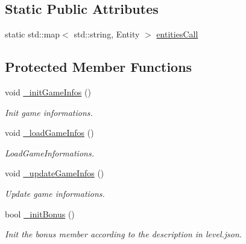 \subsection*{Static Public Attributes}
\begin{DoxyCompactItemize}
\item 
static std\+::map$<$ std\+::string, Entity $>$ \hyperlink{class_scene_game_a9e56bd4fd7c24e7097e29b7e4aff1986}{entities\+Call}
\end{DoxyCompactItemize}
\subsection*{Protected Member Functions}
\begin{DoxyCompactItemize}
\item 
\mbox{\label{class_scene_game_a8e065f6ed85191a671aaf9df7f13e08c}} 
void \hyperlink{class_scene_game_a8e065f6ed85191a671aaf9df7f13e08c}{\+\_\+init\+Game\+Infos} ()
\begin{DoxyCompactList}\small\item\em Init game informations. \end{DoxyCompactList}\item 
\mbox{\label{class_scene_game_a89da32e1946f6ece6085333527501b72}} 
void \hyperlink{class_scene_game_a89da32e1946f6ece6085333527501b72}{\+\_\+load\+Game\+Infos} ()
\begin{DoxyCompactList}\small\item\em Load\+Game\+Informations. \end{DoxyCompactList}\item 
\mbox{\label{class_scene_game_a026ec016233b2aa640b5a44f13a4cd02}} 
void \hyperlink{class_scene_game_a026ec016233b2aa640b5a44f13a4cd02}{\+\_\+update\+Game\+Infos} ()
\begin{DoxyCompactList}\small\item\em Update game informations. \end{DoxyCompactList}\item 
bool \hyperlink{class_scene_game_a03235b8b2b34ee0059ebba1e7c0a8ac6}{\+\_\+init\+Bonus} ()
\begin{DoxyCompactList}\small\item\em Init the bonus member according to the description in level.\+json. \end{DoxyCompactList}\item 

\end{DoxyCompactItemize}
